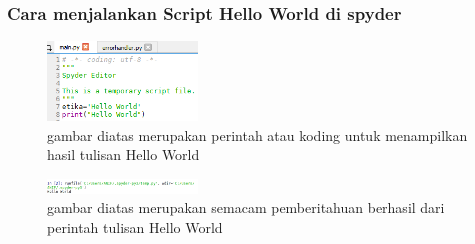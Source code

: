 \subsubsection{Cara menjalankan Script Hello World di spyder}
\begin{figure}[H]
		\includegraphics[width=4cm]{figures/1184065/PerintahHelloWorld.PNG}
		\centering
		\caption{gambar diatas merupakan perintah atau koding untuk menampilkan hasil tulisan Hello World }
	\end{figure}
\begin{figure}[H]
		\includegraphics[width=4cm]{figures/1184065/Hasil_Hello_World.PNG}
		\centering
		\caption{gambar diatas merupakan semacam pemberitahuan berhasil dari perintah tulisan Hello World }
	\end{figure}
